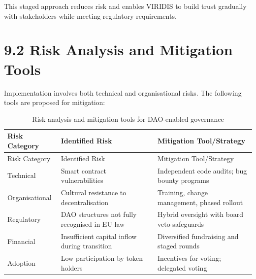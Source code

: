 \documentclass[
  english,
  12pt,
  oneside,
  open=any]{scrbook}
\begin{document}
This staged approach reduces risk and enables VIRIDIS to build trust
gradually with stakeholders while meeting regulatory requirements.

\section{9.2 Risk Analysis and Mitigation Tools}\label{sec-risks-tools}

Implementation involves both technical and organisational risks. The
following tools are proposed for mitigation:

\begin{longtable}[]{@{}
  >{\raggedright\arraybackslash}p{}
  >{\raggedright\arraybackslash}p{}
  >{\raggedright\arraybackslash}p{}@{}}
\caption{Risk analysis and mitigation tools for DAO-enabled
governance}\label{tbl-risks}\tabularnewline
\toprule\noalign{}
\begin{minipage}[b]{\linewidth}\raggedright
Risk Category
\end{minipage} & \begin{minipage}[b]{\linewidth}\raggedright
Identified Risk
\end{minipage} & \begin{minipage}[b]{\linewidth}\raggedright
Mitigation Tool/Strategy
\end{minipage} \\
\midrule\noalign{}
\endfirsthead
\toprule\noalign{}
\begin{minipage}[b]{\linewidth}\raggedright
Risk Category
\end{minipage} & \begin{minipage}[b]{\linewidth}\raggedright
Identified Risk
\end{minipage} & \begin{minipage}[b]{\linewidth}\raggedright
Mitigation Tool/Strategy
\end{minipage} \\
\midrule\noalign{}
\endhead
\bottomrule\noalign{}
\endlastfoot
Technical & Smart contract vulnerabilities & Independent code audits;
bug bounty programs \\
Organisational & Cultural resistance to decentralisation & Training,
change management, phased rollout \\
Regulatory & DAO structures not fully recognised in EU law & Hybrid
oversight with board veto safeguards \\
Financial & Insufficient capital inflow during transition & Diversified
fundraising and staged rounds \\
Adoption & Low participation by token holders & Incentives for voting;
delegated voting \\
\end{longtable}
\end{document}
